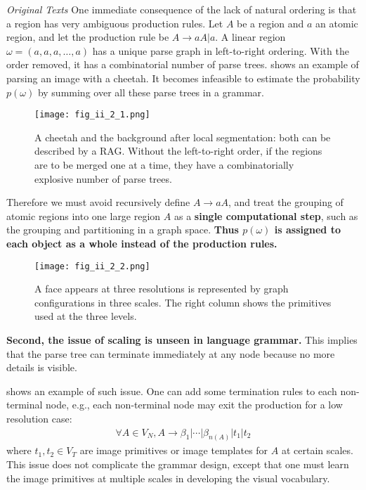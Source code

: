 \documentclass[../Notes_of_CaRiVaC.tex]{subfiles}
\begin{document}
\newpage

\begin{textbox}{\textit{Original Texts}}
One immediate consequence of the lack of natural ordering is that a region has
very ambiguous production rules. Let $A$ be a region and $a$ an atomic region,
and let the production rule be $A \to aA \vert a$. A linear region
$\omega = (a, a, a, \ldots, a)$ has a unique parse graph in left-to-right
ordering. With the order removed, it has a combinatorial number of parse trees.
 shows an example of parsing an image with a cheetah. It becomes
infeasible to estimate the probability $p(\omega)$ by summing over all these
parse trees in a grammar.
\end{textbox}
%
\begin{figure}[!htpb]
  \centering
  \texttt{[image: fig\_ii\_2\_1.png]}
  \caption{A cheetah and the background after local segmentation: both can be
    described by a RAG\@. Without the left-to-right order, if the regions are
    to be merged one at a time, they have a combinatorially explosive number
of parse trees.}%
  \label{fig:ii.2.1}
\end{figure}
%

Therefore we must avoid recursively define $A \to aA$, and treat the grouping
of atomic regions into one large region $A$ as a \textbf{single computational
step}, such as the grouping and partitioning in a graph space\cite{barbu2005}.
\textbf{Thus $p(\omega)$ is assigned to each object as a whole instead of the
production rules.}

%
\begin{figure}[!htpb]
  \centering
  \texttt{[image: fig\_ii\_2\_2.png]}
  \caption{A face appears at three resolutions is represented by graph
    configurations in three scales. The right column shows the primitives used
  at the three levels.}%
  \label{fig:ii.2.2}
\end{figure}
%

\textbf{Second, the issue of scaling is unseen in language grammar.} This
implies that the parse tree can terminate immediately at any node because no
more details is visible.

 shows an example of such issue. One can add some termination rules
to each non-terminal node, e.g., each non-terminal node may exit the production
for a low resolution case:
%
\begin{align}
  \label{eq:ii.2.1}
  \forall A \in V_N, A \to \beta_1 \vert \cdots \vert \beta_{n(A)} \vert t_1 \vert t_2
\end{align}
%
where $t_1, t_2 \in V_T$ are image primitives or image templates for $A$ at
certain scales. This issue does not complicate the grammar design, except that
one must learn the image primitives at multiple scales in developing the visual
vocabulary.
\end{document}
